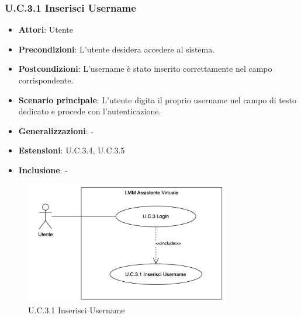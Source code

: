 \subsubsection{U.C.3.1 Inserisci Username}
\begin{itemize}
    \item \textbf{Attori}: Utente
    \item \textbf{Precondizioni}: L'utente desidera accedere al sistema.
    \item \textbf{Postcondizioni}: L'username è stato inserito correttamente nel campo corrispondente.
    \item \textbf{Scenario principale}: L'utente digita il proprio username nel campo di testo dedicato e procede con l'autenticazione.
    \item \textbf{Generalizzazioni}: -
    \item \textbf{Estensioni}: U.C.3.4, U.C.3.5
    \item \textbf{Inclusione}: -
\end{itemize}
\begin{figure}[H]
    \centering
    \includegraphics[width=0.8\textwidth]{img/U.C.3.1.png}
    \caption{U.C.3.1 Inserisci Username}
\end{figure}
\newpage
